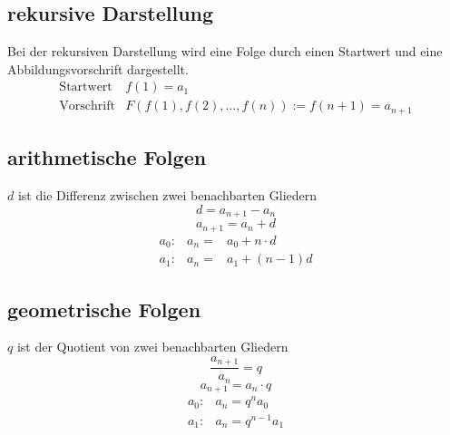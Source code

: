 \subsection{rekursive Darstellung}
Bei der rekursiven Darstellung wird eine Folge durch einen Startwert und eine 
Abbildungsvorschrift dargestellt. \\
\[ \boxed{ \begin{matrix}
\text{Startwert} & f(1) = a_1 \\
\text{Vorschrift} & F(f(1), f(2), \ldots, f(n)) := f(n + 1) = a_{n + 1}
\end{matrix}} \]

\subsection{arithmetische Folgen}
$d$ ist die Differenz zwischen zwei benachbarten Gliedern\\
\[ \boxed{d = a_{n+1} - a_n} \]
\[ \boxed{a_{n+1} = a_n + d} \]
\[ \boxed{ \begin{matrix} 
a_0 :& a_n =& a_0 + n \cdot d \\
a_1 :& a_n =& a_1 + (n - 1)d 
\end{matrix}}\]

\subsection{geometrische Folgen}
$q$ ist der Quotient von zwei benachbarten Gliedern\\
\[ \boxed{\frac{a_{n+1}}{a_n} = q} \]
\[ \boxed{a_{n+1} = a_n \cdot q} \]
\[ \boxed{\begin{array}{ll}
a_0 :& a_n = q^{n} a_0\\
a_1 :& a_n = q^{n-1} a_1
\end{array}} \]

\ifti
